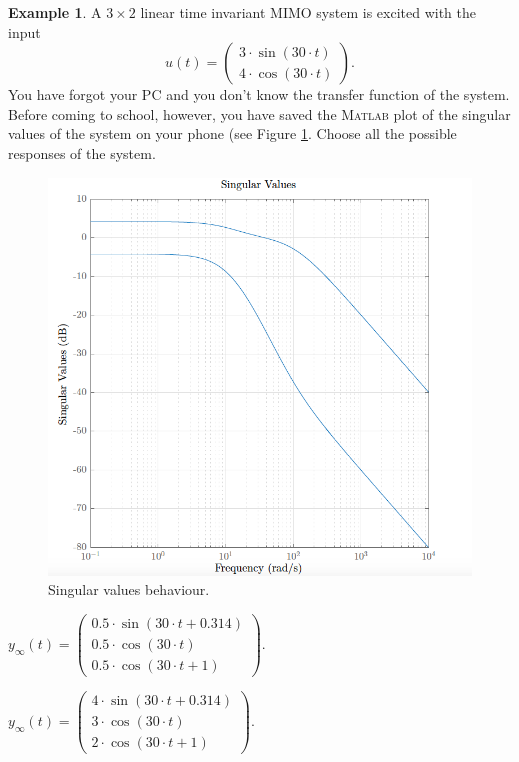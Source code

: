 \documentclass[a4paper,12 pt]{article}
\numberwithin{equation}{section}
\theoremstyle{definition}
\newtheorem{bsp}{Example}
\theoremstyle{remark}
\theoremstyle{definition}
\theoremstyle{definition}
\theoremstyle{definition}
\theoremstyle{remark}
\begin{document}
\newpage

\begin{bsp}
A $3\times 2$ linear time invariant MIMO system is excited with the input
\begin{equation*}
u(t)=\begin{pmatrix} 
3\cdot \sin(30\cdot t)\\
4\cdot \cos(30\cdot t)
\end{pmatrix}.
\end{equation*}
You have forgot your PC and you don't know the transfer function of the system. Before coming to school, however, you have saved the \textsc{Matlab} plot of the singular values of the system on your phone (see Figure \ref{fig:phone}. Choose all the possible responses of the system.

\begin{figure}[h!]
\begin{center}
\includegraphics[width=0.6\columnwidth]{phone.png}
\caption{Singular values behaviour.}
\label{fig:phone}
\end{center}
\end{figure}
 \begin{todolist}
  \item $y_\infty(t)=\begin{pmatrix} 
0.5\cdot \sin(30\cdot t+0.314)\\
0.5\cdot \cos(30\cdot t)\\
0.5\cdot \cos(30\cdot t +1)
\end{pmatrix}$.
  \item $y_\infty(t)=\begin{pmatrix} 
4\cdot \sin(30\cdot t+0.314)\\
3\cdot \cos(30\cdot t)\\
2\cdot \cos(30\cdot t +1)
\end{pmatrix}$.

\end{todolist}
\end{bsp}
\end{document}
